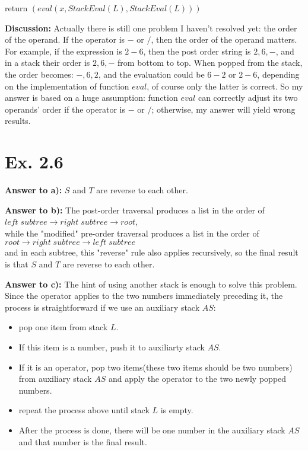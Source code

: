 \documentclass[a4paper,11pt]{article}
\theoremstyle{mytheor}
\begin{document}
return $(eval(x, StackEval(L), StackEval(L)))$

\noindent\textbf{Discussion:} Actually there is still one problem I haven't resolved yet: the order of the operand. If the operator is $-$ or $/$, then the order of the operand matters. For example, if the expression is $2-6$, then the post order string is $2, 6, -$, and in a stack their order is $2,6,-$ from bottom to top. When popped from the stack, the order becomes: $-, 6, 2$, and the evaluation could be $6-2$ or $2-6$, depending on the implementation of function $eval$, of course only the latter is correct. So my answer is based on a huge assumption: function $eval$ can correctly adjust its two operands' order if the operator is $-$ or $/$; otherwise, my answer will yield wrong results.

\vspace{1.2in}



\section*{Ex. 2.6}
\noindent\textbf{Answer to a):} $S$ and $T$ are reverse to each other. 

\vspace{1.2in}

\noindent\textbf{Answer to b):} The post-order traversal produces a list in the order of \\ $left\; subtree \rightarrow right\; subtree \rightarrow root$, \\while the "modified" pre-order traversal produces a list in the order of \\$root \rightarrow right\;subtree \rightarrow left\;subtree$ \\ and in each subtree, this "reverse" rule also applies recursively, so the final result is that $S$ and $T$ are reverse to each other.

\vspace{1.2in}

\noindent\textbf{Answer to c):} The hint of using another stack is enough to solve this problem. Since the operator applies to the two numbers immediately preceding it, the process is straightforward if we use an auxiliary stack $AS$:
\begin{itemize}
    \item pop one item from stack $L$. \item If this item is a number, push it to auxiliarty stack $AS$. \item If it is an operator, pop two items(these two items should be two numbers) from auxiliary stack $AS$ and apply the operator to the two newly popped numbers. \item repeat the process above until stack $L$ is empty. \item After the process is done, there will be one number in the auxiliary stack $AS$ and that number is the final result.
\end{itemize}
\end{document}
